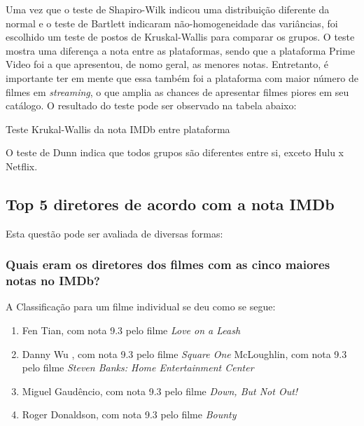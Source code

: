 \documentclass[a4paper, 12pt]{article} %
\begin{document}
Uma vez que o teste de Shapiro-Wilk indicou uma distribuição diferente da normal e o teste de Bartlett indicaram não-homogeneidade das variâncias, foi escolhido um teste de postos de Kruskal-Wallis para comparar os grupos. O teste mostra uma diferença a nota entre as plataformas, sendo que a plataforma Prime Video foi a que apresentou, de nomo geral, as menores notas. Entretanto, é importante ter em mente que essa também foi a plataforma com maior número de filmes em \emph{streaming}, o que amplia as chances de apresentar filmes piores em seu catálogo. O resultado do teste pode ser observado na tabela abaixo:


\begin{quadro}[H]
\centering
\caption{Teste Krukal-Wallis da nota IMDb entre plataforma }
\label{R-Q-Teste-1}
\vspace{0.1cm}
\end{quadro}

O teste de Dunn indica que todos grupos são diferentes entre si, exceto Hulu x Netflix.

\subsection {Top 5 diretores de acordo com a nota IMDb}

Esta questão pode ser avaliada de diversas formas:

\subsubsection{Quais eram os diretores dos filmes com as cinco maiores notas no IMDb?}

A Classificação para um filme individual se deu como se segue:\\

\begin{enumerate}[topsep=0pt,partopsep=0pt]
\item Fen Tian, com nota 9.3 pelo filme \emph{ Love on a Leash}
\item Danny Wu , com nota 9.3  pelo filme \emph{Square One}  
\itemTom McLoughlin, com nota  9.3 pelo filme \emph{Steven Banks: Home Entertainment Center}
\item Miguel Gaudêncio, com nota  9.3 pelo filme \emph{Down, But Not Out!}            
\item Roger Donaldson, com nota  9.3 pelo filme \emph{Bounty}      
\end{enumerate}
\end{document}
